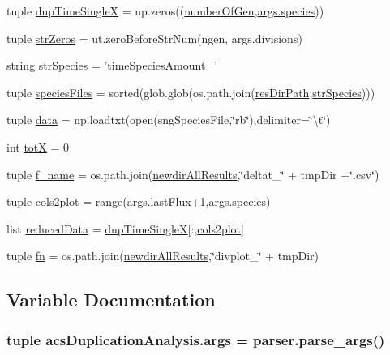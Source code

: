 \begin{DoxyCompactItemize}
\item 
tuple \hyperlink{a00094_aebf6e36a8ab4ee728eb30781f25cbba2}{dup\-Time\-Single\-X} = np.\-zeros((\hyperlink{a00094_a4db9785401a572b6067cabb96b3c5ecd}{number\-Of\-Gen},\hyperlink{a00021_ad7a297e3111ffc45eba4a3b88590cb30}{args.\-species}))
\item 
tuple \hyperlink{a00094_a234dce1a3fa6fada4ecff6272abe38f1}{str\-Zeros} = ut.\-zero\-Before\-Str\-Num(ngen, args.\-divisions)
\item 
string \hyperlink{a00094_a16ce767c459a75b657e3a2592b4228d9}{str\-Species} = 'time\-Species\-Amount\-\_\-'
\item 
tuple \hyperlink{a00094_ad70f67ea048141937d94adbeb21b8803}{species\-Files} = sorted(glob.\-glob(os.\-path.\-join(\hyperlink{a00094_ace1b658a12d17a1359f37ebf927ea9b5}{res\-Dir\-Path},\hyperlink{a00094_a16ce767c459a75b657e3a2592b4228d9}{str\-Species})))
\item 
tuple \hyperlink{a00094_ae11ddb8ad49a2afeaa7276e3e1a59a54}{data} = np.\-loadtxt(open(sng\-Species\-File,\char`\"{}rb\char`\"{}),delimiter=\char`\"{}\textbackslash{}t\char`\"{})
\item 
int \hyperlink{a00094_a272117a5453b492c5fe58c89b0454921}{tot\-X} = 0
\item 
tuple \hyperlink{a00094_a6e5f6f3f617f9d327da64d8cb492cc6f}{f\-\_\-name} = os.\-path.\-join(\hyperlink{a00094_a78f5a1cb54411a11cc368302aac35ca9}{newdir\-All\-Results},\char`\"{}deltat\-\_\-\char`\"{} + tmp\-Dir +\char`\"{}.csv\char`\"{})
\item 
tuple \hyperlink{a00094_aeb0384baa8b5272c0a730d55994c3b1c}{cols2plot} = range(args.\-last\-Flux+1,\hyperlink{a00021_ad7a297e3111ffc45eba4a3b88590cb30}{args.\-species})
\item 
list \hyperlink{a00094_a3b11d6e735ad53661a17cf0854cb9270}{reduced\-Data} = \hyperlink{a00094_aebf6e36a8ab4ee728eb30781f25cbba2}{dup\-Time\-Single\-X}\mbox{[}\-:,\hyperlink{a00094_aeb0384baa8b5272c0a730d55994c3b1c}{cols2plot}\mbox{]}
\item 
tuple \hyperlink{a00094_a668f6f31c1cf7235d2843b0b5f95b08d}{fn} = os.\-path.\-join(\hyperlink{a00094_a78f5a1cb54411a11cc368302aac35ca9}{newdir\-All\-Results},\char`\"{}divplot\-\_\-\char`\"{} + tmp\-Dir)
\end{DoxyCompactItemize}


\subsection{Variable Documentation}
\hypertarget{a00094_a7e2e8e21468d3a77a5b5727b1db34cf5}{
\subsubsection[{args}]{\setlength{\rightskip}{0pt plus 5cm}tuple acs\-Duplication\-Analysis.\-args = parser.\-parse\-\_\-args()}}\label{a00094_a7e2e8e21468d3a77a5b5727b1db34cf5}


